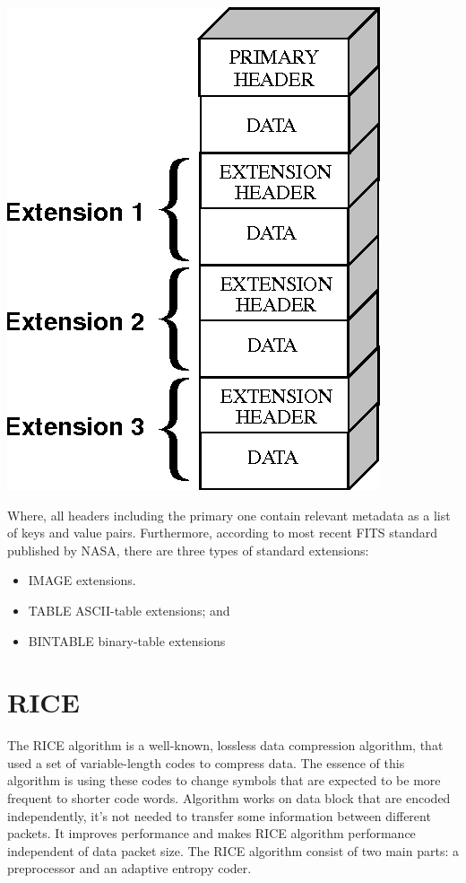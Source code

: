 \documentclass[licencjacka,en]{pracamgr}
\begin{document}
\centerline{\includegraphics[scale=0.3]{fits}}



Where, all headers including the primary one contain relevant metadata as a list of keys and value pairs.
Furthermore, according to most recent FITS standard published by NASA, there are three types of standard extensions:
\begin{itemize}
	\item IMAGE extensions.
	\item TABLE ASCII-table extensions; and
	\item BINTABLE binary-table extensions
\end{itemize}


\section{RICE}
The RICE algorithm is a well-known, lossless data compression algorithm, that used a set of variable-length codes to compress data. The essence of this algorithm is using these codes to change symbols that are expected to be more frequent to shorter code words. Algorithm works on data block that are encoded independently, it’s not needed to transfer some information between different packets. It improves performance and makes RICE algorithm performance independent of data packet size. The RICE algorithm consist of two main parts: a preprocessor and an adaptive entropy coder.
\end{document}
